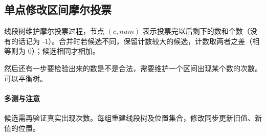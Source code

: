 \subsection{单点修改区间摩尔投票}
线段树维护摩尔投票过程，节点 $(c,num)$ 表示投票完以后剩下的数和个数（没有的话记为 -1）。合并时若候选不同，保留计数较大的候选，计数取两者之差（相等则为 0）；候选相同才相加。

然后还有一步要检验出来的数是不是合法，需要维护一个区间出现某个数的次数。可以平衡树。

\paragraph{多测与注意} 候选需再验证真实出现次数。每组重建线段树及位置集合，修改同步更新旧值、新值的位置。
